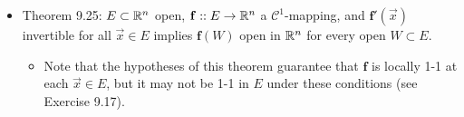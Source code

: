 \documentclass[../notes.tex]{subfiles}
\begin{document}
\begin{itemize}
\begin{enumerate}[label={(\alph*)}]
\begin{proof}
\begin{equation*}
                \frac{|\mathbf{g}(\vec{y}+\vec{k})-\mathbf{g}(\vec{y})-T\vec{k}|}{|\vec{k}|} \leq \frac{\norm{T}|\mathbf{f}(\vec{x}+\vec{h})-\mathbf{f}(\vec{x})-\mathbf{f}'(\vec{x})\vec{h}|}{\lambda|\vec{h}|}
            \end{equation*}
            Consequently, $\vec{k}\to\bm{0}$ implies that $\vec{h}\to\bm{0}$, which implies that the right side of the above inequality goes to zero, which implies that the left side of the above inequality goes to zero. Thus, $\mathbf{g}'(\vec{y})=T$, so
            \begin{equation*}
                \mathbf{g}'(\vec{y}) = [\mathbf{f}'(\mathbf{g}(\vec{y}))]^{-1}
            \end{equation*}
            for all $\vec{y}\in V$, as desired.\par
            To prove that $\mathbf{g}'$ is continuous on $V$, Theorem 4.7 and the above equation tell us that it will suffice to show that $\mathbf{g}:V\to U$ is continuous, $\mathbf{f'}:U\to L(\R^n)$ is continuous, and $M\mapsto M^{-1}:L(\R^n)\to L(\R^n)$ is continuous. But we have the first condition since differentiability implies continuity and $\mathbf{g}$ is differentiable, we have the second condition since $\mathbf{f}\in\mathscr{C}^1$ by hypothesis, and we have the third condition by Theorem 9.8b, as desired.
        \end{proof}
    \end{enumerate}
    \item Theorem 9.25: $E\subset\mathbb{R}^n$ open, $\mathbf{f}::E\to\mathbb{R}^n$ a $\mathscr{C}^1$-mapping, and $\mathbf{f}'(\vec{x})$ invertible for all $\vec{x}\in E$ implies $\mathbf{f}(W)$ open in $\mathbb{R}^n$ for every open $W\subset E$.
    \begin{itemize}
        \item Note that the hypotheses of this theorem guarantee that $\mathbf{f}$ is locally 1-1 at each $\vec{x}\in E$, but it may not be 1-1 in $E$ under these conditions (see Exercise 9.17).
    \end{itemize}
\end{itemize}
\end{document}
